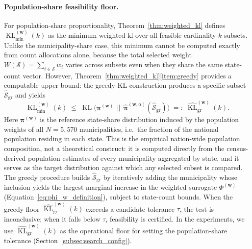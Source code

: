 \documentclass[10pt,journal]{IEEEtran}
\newcommand{\1}{\mathbf{1}}
\newcommand{\bw}{\mathbf{w}}
\newcommand{\bpi}{\boldsymbol{\pi}}
\newcommand{\Sel}{\mathcal{S}}
\DeclareMathOperator{\KL}{KL}
\theoremstyle{ieeethm}
\begin{document}
\paragraph{Population-share feasibility floor.}
For population-share proportionality, Theorem~\ref{thm:weighted_kl} defines $\KL_{\min}^{(\bw)}(k)$ as the minimum weighted \gls{kl} over all feasible cardinality-$k$ subsets. Unlike the municipality-share case, this minimum cannot be computed exactly from count allocations alone, because the total selected weight $W(\Sel)=\sum_{i\in\Sel}w_i$ varies across subsets even when they share the same state-count vector. However, Theorem~\ref{thm:weighted_kl}\ref{item:greedy} provides a computable upper bound: the greedy-KL construction produces a specific subset $\widehat{\Sel}_{\mathrm{gr}}$ and yields
\begin{equation}
\label{eq:greedy_kl_floor}
\KL_{\min}^{(\bw)}(k)
\;\le\;
\KL\!\big(\bpi^{(\bw)}\,\big\|\,\widehat{\bpi}^{(\bw,\alpha)}(\widehat{\Sel}_{\mathrm{gr}})\big)
\;=:\;
\widehat{\KL}^{(\bw)}_{\mathrm{gr}}(k).
\end{equation}
Here $\bpi^{(\bw)}$ is the reference state-share distribution induced by the population weights of all $N=5{,}570$ municipalities, i.e.\ the fraction of the national population residing in each state. This is the empirical nation-wide population composition, not a theoretical construct: it is computed directly from the census-derived population estimates of every municipality aggregated by state, and it serves as the target distribution against which any selected subset is compared. The greedy procedure builds $\widehat{\Sel}_{\mathrm{gr}}$ by iteratively adding the municipality whose inclusion yields the largest marginal increase in the weighted surrogate $\Phi^{(\bw)}$ (Equation~\eqref{eq:phi_w_definition}), subject to state-count bounds. When the greedy floor $\widehat{\KL}^{(\bw)}_{\mathrm{gr}}(k)$ exceeds a candidate tolerance $\tau$, the test is inconclusive; when it falls below $\tau$, feasibility is certified. In the experiments, we use $\widehat{\KL}^{(\bw)}_{\mathrm{gr}}(k)$ as the operational floor for setting the population-share tolerance (Section~\ref{subsec:search_config}).
\end{document}
